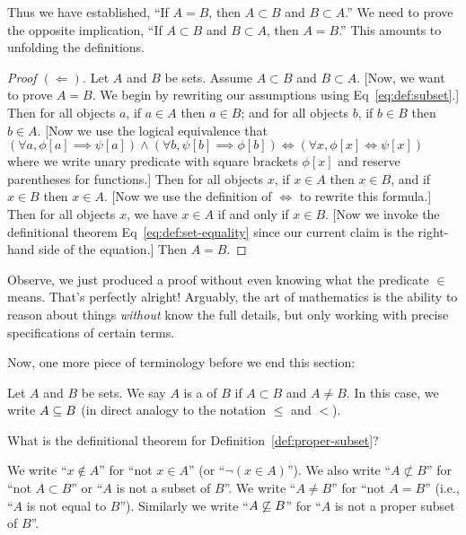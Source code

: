 Thus we have established, ``If $A=B$, then $A\subset B$ and $B\subset A$.''
We need to prove the opposite implication, ``If $A\subset B$ and
$B\subset A$, then $A=B$.'' This amounts to unfolding the definitions.

\begin{proof}[Proof $(\Longleftarrow)$]
Let $A$ and $B$ be sets. Assume $A\subset B$ and $B\subset A$. [Now, we
want to prove $A=B$. We begin by rewriting our assumptions using
Eq~\eqref{eq:def:subset}.] Then for all objects $a$, if $a\in A$ then
$a\in B$; and for all objects $b$, if $b\in B$ then $b\in A$. [Now we
use the logical equivalence that $(\forall a,\phi[a]\implies\psi[a])\land(\forall b,\psi[b]\implies\phi[b])\iff(\forall x,\phi[x]\iff\psi[x])$
where we write unary predicate with square brackets $\phi[x]$ and
reserve parentheses for functions.] Then for all objects $x$, if $x\in A$ then
$x\in B$, and if $x\in B$ then $x\in A$. [Now we use the definition of
$\iff$ to rewrite this formula.] Then for all objects $x$, we have $x\in A$
if and only if $x\in B$. [Now we invoke the definitional theorem Eq~\ref{eq:def:set-equality}
since our current claim is the right-hand side of the equation.]
Then $A=B$.
\end{proof}

\begin{remark}
Observe, we just produced a proof without even knowing what the
predicate $\in$ means. That's perfectly alright! Arguably, the art of
mathematics is the ability to reason about things \emph{without} know
the full details, but only working with precise specifications of
certain terms.
\end{remark}

Now, one more piece of terminology before we end this section:
\begin{definition}\label{def:proper-subset}
Let $A$ and $B$ be sets. We say $A$ is a  of $B$
if $A\subset B$ and $A\neq B$. In this case, we write $A\propersubset B$
(in direct analogy to the notation $\leq$ and $<$).
\end{definition}

\begin{xca}
What is the definitional theorem for Definition~\ref{def:proper-subset}?
\end{xca}

\begin{notation}
We write ``$x\notin A$'' for ``not $x\in A$'' (or ``$\neg(x\in A)$'').
We also write ``$A\nsubset B$'' for ``not $A\subset B$'' or ``$A$ is not
a subset of $B$''. We write
``$A\neq B$'' for ``not $A=B$'' (i.e., ``$A$ is not equal to
$B$''). Similarly we write ``$A\not\propersubset B$'' for ``$A$ is not a
proper subset of $B$''.
\end{notation}

